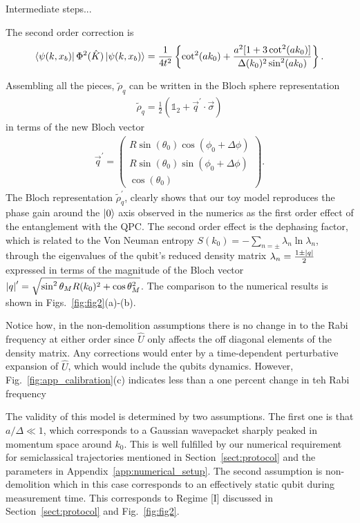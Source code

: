 \documentclass[10pt,
 amsmath,amssymb,
 aps,prb, twocolumn
]{revtex4-2}
\newcommand{\id}{\mathds{1}}
\newcommand\sj[1]{ {\color{cyan} #1} }
\begin{document}
\sj{Intermediate steps...}

The second order correction is
\begin{align}
    \bra{\psi(k,x_b)} \Phi^2(\hat{K})\ket{\psi(k,x_b)}  = \frac{1}{4 t^2} \left\{ \cot^2(a k_0) +\frac{a^2 [1 +3 \cot^2(a k_0)] }{\Delta (k_0)^2 \sin^2(a k_0)}  \right\}.
\end{align}

Assembling all the pieces, \mbox{$\tilde{\rho}_q$} can be written in the Bloch sphere representation
\begin{align}
    \tilde{\rho}_q = \frac{1}{2}(\id_2+\vec{q}^{\prime}\cdot\vec{\sigma})
\end{align}
in terms of the new Bloch vector
\begin{align}
    \vec{q}^\prime = \begin{pmatrix}
        R \sin(\theta_0) \cos{(\phi_0 +\Delta\phi)}\\
        R\sin(\theta_0) \sin{(\phi_0 +\Delta\phi)}\\
        \cos(\theta_0)
    \end{pmatrix}.
\end{align}
The Bloch representation \mbox{$\tilde{\rho}_q^\prime$}, clearly shows that our toy model reproduces the phase gain around the \mbox{$\ket{0}$} axis observed in the numerics as the first order effect of the entanglement with the QPC. The second order effect is the dephasing factor, which is related to the Von Neuman entropy \mbox{$S(k_0) = -\sum_{n=\pm}\lambda_n \ln{\lambda_n}$},  through the eigenvalues of the qubit's reduced density matrix \mbox{$\lambda_n = \frac{1\pm \abs{q}}{2}$} expressed in terms of the magnitude of the Bloch vector $\abs{q}^\prime = \sqrt{\sin^2\theta_M R(k_0)^2 + \cos\theta^2_M}$. The comparison to the numerical results is shown in Figs.~\ref{fig:fig2}(a)-(b).

Notice how, in the non-demolition assumptions there is no change in to the Rabi frequency at either order since \mbox{$\hat{U}$} only affects the off diagonal elements of the density matrix. Any corrections would enter by a time-dependent perturbative expansion of \mbox{$\hat{U}$}, which would include the qubits dynamics. However,  Fig.~\eqref{fig:app_calibration}(c) indicates less than a one percent change in teh Rabi frequency

The validity of this model is determined by two assumptions. The first one is that \mbox{$a/\Delta \ll 1 $}, which corresponds to a Gaussian wavepacket sharply peaked in momentum space around $k_0$. This is well fulfilled by our numerical requirement for semiclassical trajectories mentioned in Section~\ref{sect:protocol} and the parameters in Appendix~\ref{app:numerical_setup}. The second assumption is non-demolition which in this case corresponds to an effectively static qubit during measurement time. This corresponds to Regime [I] discussed in Section~\ref{sect:protocol} and Fig.~\ref{fig:fig2}.
\end{document}
